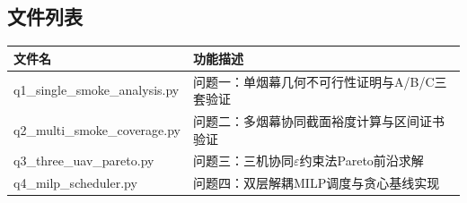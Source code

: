 \documentclass[withoutpreface,bwprint]{cumcmthesis}
\begin{document}
\newpage


\begin{appendices}
	
	
	
	
\section{文件列表}
\begin{table}[H]
\centering
\begin{tabularx}{\textwidth}{LL}
\toprule
文件名   & 功能描述 \\
\midrule
q1\_single\_smoke\_analysis.py & 问题一：单烟幕几何不可行性证明与A/B/C三套验证 \\
q2\_multi\_smoke\_coverage.py & 问题二：多烟幕协同截面裕度计算与区间证书验证 \\
q3\_three\_uav\_pareto.py & 问题三：三机协同$\varepsilon$约束法Pareto前沿求解 \\
q4\_milp\_scheduler.py & 问题四：双层解耦MILP调度与贪心基线实现 \\
\bottomrule
\end{tabularx}
\label{tab:文件列表}
\end{table}


\end{appendices}
\end{document}
